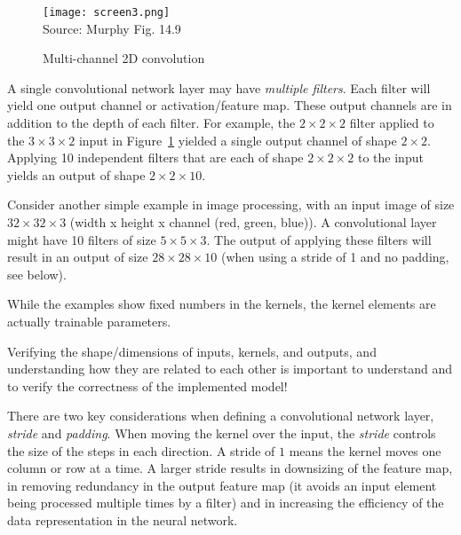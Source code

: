 \begin{figure}[b]
\centering
\texttt{[image: screen3.png]} \\

\scriptsize Source: Murphy Fig. 14.9
\caption{Multi-channel 2D convolution}
\label{fig:screen3}
\end{figure}

A single convolutional network layer may have \emph{multiple filters}. Each filter will yield one output channel or activation/feature map. These output channels are in addition to the depth of each filter. For example, the $2 \times 2 \times 2$ filter applied to the $3 \times 3 \times 2$ input in Figure~\ref{fig:screen3} yielded a single output channel of shape $2 \times 2$. Applying 10 independent filters that are each of shape $2 \times 2 \times 2$ to the input yields an output of shape $2 \times 2 \times 10$.

Consider another simple example in image processing, with an input image of size $32 \times 32 \times 3$ (width x height x channel (red, green, blue)). A convolutional layer might have 10 filters of size $5 \times 5 \times 3$. The output of applying these filters will result in an output of size $28 \times 28 \times 10$ (when using a stride of 1 and no padding, see below).

\begin{alertbox}
While the examples show fixed numbers in the kernels, the kernel elements are actually trainable parameters.
\end{alertbox}

\begin{alertbox}
Verifying the shape/dimensions of inputs, kernels, and outputs, and understanding how they are related to each other is important to understand and to verify the correctness of the implemented model!
\end{alertbox}

There are two key considerations when defining a convolutional network layer, \emph{stride} and \emph{padding}. When moving the kernel over the input, the \emph{stride} controls the size of the steps in each direction. A stride of $1$ means the kernel moves one column or row at a time. A larger stride results in downsizing of the feature map, in removing redundancy in the output feature map (it avoids an input element being processed multiple times by a filter) and in increasing the efficiency of the data representation in the neural network.

